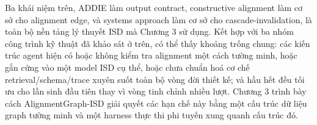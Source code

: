 \documentclass[../main.tex]{subfiles}
\begin{document}
Ba khái niệm trên, ADDIE làm output contract, constructive alignment làm cơ sở cho alignment edge, và systems approach làm cơ sở cho cascade-invalidation, là toàn bộ nền tảng lý thuyết ISD mà Chương 3 sử dụng. Kết hợp với ba nhóm công trình kỹ thuật đã khảo sát ở trên, có thể thấy khoảng trống chung: các kiến trúc agent hiện có hoặc không kiểm tra alignment một cách tường minh, hoặc gắn cứng vào một model ISD cụ thể, hoặc chưa chuẩn hoá cơ chế retrieval/schema/trace xuyên suốt toàn bộ vòng đời thiết kế; và hầu hết đều tối ưu cho lần sinh đầu tiên thay vì vòng tinh chỉnh nhiều lượt. Chương 3 trình bày cách AlignmentGraph-ISD giải quyết các hạn chế này bằng một cấu trúc dữ liệu graph tường minh và một harness thực thi phi tuyến xung quanh cấu trúc đó.
\end{document}
